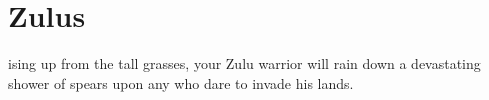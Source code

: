 
\clearpage

\section{\textsf{Zulus}}


ising up from the tall grasses, your Zulu warrior will rain down a devastating shower of spears upon any who dare to invade his lands.

